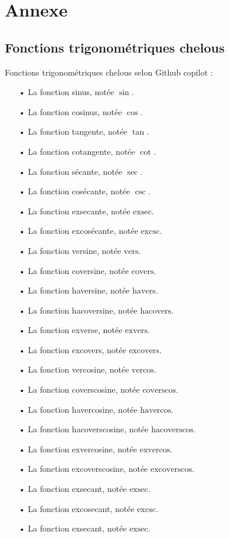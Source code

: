 \documentclass[a4paper]{article}
\begin{document}
	\section{Annexe}

		\subsection*{Fonctions trigonométriques chelous} \label{fonction_trigo_chelous}

		Fonctions trigonométriques chelous selon Github copilot :

		\begin{itemize}
				\item [•] La fonction sinus, notée $\sin$.
				\item [•] La fonction cosinus, notée $\cos$.
				\item [•] La fonction tangente, notée $\tan$.
				\item [•] La fonction cotangente, notée $\cot$.
				\item [•] La fonction sécante, notée $\sec$.
				\item [•] La fonction cosécante, notée $\csc$.
				\item [•] La fonction exsecante, notée $\text{exsec}$.
				\item [•] La fonction excosécante, notée $\text{excsc}$.
				\item [•] La fonction versine, notée $\text{vers}$.
				\item [•] La fonction coversine, notée $\text{covers}$.
				\item [•] La fonction haversine, notée $\text{havers}$.
				\item [•] La fonction hacoversine, notée $\text{hacovers}$.
				\item [•] La fonction exverse, notée $\text{exvers}$.
				\item [•] La fonction excovers, notée $\text{excovers}$.
				\item [•] La fonction vercosine, notée $\text{vercos}$.
				\item [•] La fonction coverscosine, notée $\text{coverscos}$.
				\item [•] La fonction havercosine, notée $\text{havercos}$.
				\item [•] La fonction hacoverscosine, notée $\text{hacoverscos}$.
				\item [•] La fonction exvercosine, notée $\text{exvercos}$.
				\item [•] La fonction excoverscosine, notée $\text{excoverscos}$.
				\item [•] La fonction exsecant, notée $\text{exsec}$.
				\item [•] La fonction excosecant, notée $\text{excsc}$.
				\item [•] La fonction exsecant, notée $\text{exsec}$.
			\end{itemize}
\end{document}
